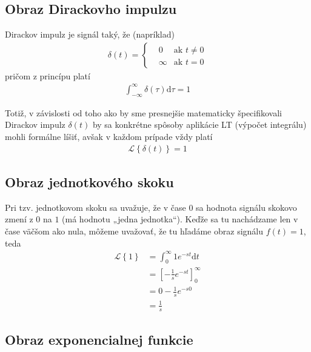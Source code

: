 \documentclass[a4paper, 10pt, ]{article}
\begin{document}
\subsection{Obraz Dirackovho impulzu}

Dirackov impulz je signál taký, že (napríklad)
\begin{align}
    \delta(t) =
    \left\{
        \begin{aligned}
            &0 & \text{ak $t \neq 0$} \\
            &\infty & \text{ak $t = 0$}
        \end{aligned}
    \right.
\end{align}
pričom z princípu platí
\begin{align}
    \int_{-\infty}^\infty \delta(\tau) \text{d}\tau = 1
\end{align}

Totiž, v závislosti od toho ako by sme presnejšie matematicky špecifikovali Dirackov impulz $\delta(t)$ by sa konkrétne spôsoby aplikácie LT (výpočet integrálu) mohli formálne líšiť, avšak v každom prípade vždy platí
\begin{align}
    \mathcal L \left\{ \delta(t) \right\} = 1
\end{align}





\subsection{Obraz jednotkového skoku}
Pri tzv. jednotkovom skoku sa uvažuje, že v čase $0$ sa hodnota signálu skokovo zmení z $0$ na $1$ (má hodnotu „jedna jednotka“). Keďže sa tu nachádzame len v čase väčšom ako nula, môžeme uvažovať, že tu hľadáme obraz signálu $f(t) = 1$, teda
\begin{equation}
    \begin{aligned}
        \mathcal L \left\{ 1 \right\} &= \int_0^\infty 1 e^{-st}\text{d}t \\
        &= \left[ - \frac{1}{s} e^{-st} \right]_0^\infty \\
        &= 0 - \frac{1}{s} e^{-s0} \\
        &= \frac{1}{s}
    \end{aligned}
\end{equation}



\subsection{Obraz exponencialnej funkcie}
\label{vyhlcast}
\end{document}
